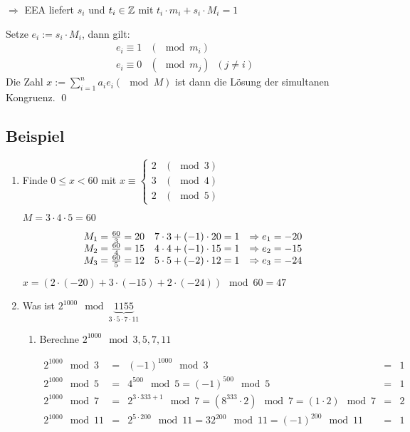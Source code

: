 $\Rightarrow$ EEA liefert $s_i$ und $t_i \in \mathbb{Z}$ mit $t_i \cdot m_i + s_i \cdot M_i = 1$

Setze $e_i := s_i \cdot M_i$, dann gilt:
\[\begin{array}{ll}
	e_i \equiv 1	& (\mod m_i) \\
	e_i \equiv 0 	& (\mod m_j) \;\; (j \neq i)
\end{array}\]
%
Die Zahl $x := \sum_{i=1}^{n}a_ie_i (\mod M)$ ist dann die Lösung der simultanen Kongruenz. \qed


\subsection{Beispiel}

\begin{enumerate}

	\item
	Finde $0 \leq x < 60$ mit 
	$x \equiv \begin{cases}
	2 & (\mod 3) \\
	3 & (\mod 4) \\
	2 & (\mod 5)
	\end{cases}$
	
	$M = 3 \cdot 4 \cdot 5 = 60$
	
	\[\begin{array}{lr@{\quad\Rightarrow\;}l}
	M_1 = \frac{60}{3} = 20 & 7 \cdot 3 + (-1) \cdot 20 = 1	& e_1 = -20 \\
	M_2 = \frac{60}{4} = 15 & 4 \cdot 4 + (-1) \cdot 15 = 1	& e_2 = -15 \\
	M_3 = \frac{60}{5} = 12	& 5 \cdot 5 + (-2) \cdot 12 = 1	& e_3 = -24
	\end{array}\]
	
	$x = (2 \cdot (-20) + 3 \cdot (-15) + 2 \cdot (-24)) \mod 60 = 47$
	
	\item
	Was ist $2^{1000} \mod \underbrace{1155}_{3 \cdot 5 \cdot 7 \cdot 11}$
	
	\begin{enumerate}
		\item
		Berechne $2^{1000} \mod 3, 5, 7, 11$
		
		$\begin{array}{lcrcl}
		2^{1000} \mod 3 &=& (-1)^{1000} \mod 3 &=& 1 \\
		2^{1000} \mod 5 &=& 4^{500} \mod 5 = (-1)^{500} \mod 5 &=& 1 \\
		2^{1000} \mod 7 &=& 2^{3 \cdot 333+1} \mod 7 = (8^{333} \cdot 2) \mod 7 = (1 \cdot 2) \mod 7 &=& 2 \\
		2^{1000} \mod 11 &=& 2^{5 \cdot 200} \mod 11 = 32^{200} \mod 11 = (-1)^{200} \mod 11 &=& 1
		\end{array}$
		

\end{enumerate}
\end{enumerate}
